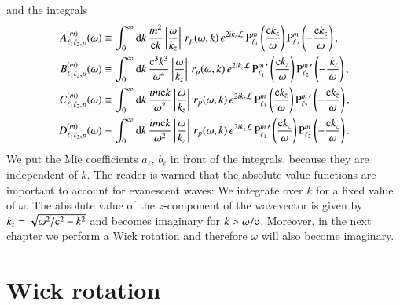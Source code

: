 and the integrals
\begin{align}
\label{scattering_int_A_r}
A_{\ell_1 \ell_2,p}^{(m)}(\omega) &\equiv \int_0^\infty \mathrm{d}k \, \frac{m^2}{\mathrm{c} k} \left|\frac{\omega}{k_z}\right| \, r_p(\omega, k) \, e^{2i k_z \mathcal{L}} \, {\text{P}_{\ell_1}^{m}}\left(\frac{\mathrm{c} k_z}{\omega}\right) {\text{P}_{\ell_2}^{m}}\left(-\frac{\mathrm{c} k_z}{\omega}\right), \\
\label{scattering_int_B_r}
B_{\ell_1 \ell_2,p}^{(m)}(\omega) &\equiv \int_0^\infty \mathrm{d}k \, \frac{\mathrm{c}^3 k^3}{\omega^4} \left|\frac{\omega}{k_z}\right| \, r_p(\omega, k) \, e^{2i k_z \mathcal{L}} \, {\text{P}_{\ell_1}^{m}}^\prime\left(\frac{\mathrm{c} k_z}{\omega}\right) {\text{P}_{\ell_2}^{m}}^\prime\left(-\frac{\ k_z}{\omega}\right), \\
\label{scattering_int_C_r}
C_{\ell_1 \ell_2,p}^{(m)}(\omega) &\equiv \int_0^\infty \mathrm{d}k \, \frac{i m \mathrm{c} k}{\omega^2} \left|\frac{\omega}{k_z}\right| \, r_p(\omega, k) \, e^{2i k_z \mathcal{L}} \, {\text{P}_{\ell_1}^{m}}\left(\frac{\mathrm{c} k_z}{\omega}\right) {\text{P}_{\ell_2}^{m}}^\prime\left(-\frac{\mathrm{c} k_z}{\omega}\right), \\
\label{scattering_int_D_r}
D_{\ell_1 \ell_2,p}^{(m)}(\omega) &\equiv \int_0^\infty \mathrm{d}k \, \frac{i m \mathrm{c} k}{\omega^2} \left|\frac{\omega}{k_z}\right| \, r_p(\omega, k) \, e^{2i k_z \mathcal{L}} \, {\text{P}_{\ell_1}^{m}}^\prime\left(\frac{\mathrm{c} k_z}{\omega}\right) {\text{P}_{\ell_2}^{m}}\left(-\frac{\mathrm{c} k_z}{\omega}\right).
\end{align}
We put the Mie coefficients $a_\ell$, $b_\ell$ in front of the integrals,
because they are independent of $k$. The reader is warned that the absolute
value functions are important to account for evanescent waves: We integrate
over $k$ for a fixed value of $\omega$. The absolute value of the
$z$-component of the wavevector is given by $k_z=\sqrt{\omega^2/\mathrm{c}^2-k^2}$ and
becomes imaginary for $k>\omega/\mathrm{c}$. Moreover, in the next chapter we perform a
Wick rotation and therefore $\omega$ will also become imaginary.

\section{Wick rotation}
\label{section_wick}

